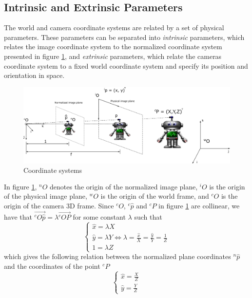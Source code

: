 \subsection{Intrinsic and Extrinsic Parameters}
The world and camera coordinate systems are related by a set of physical parameters. These parameters can be separated into \textit{intrinsic} parameters, which relates the image coordinate system to the normalized coordinate system presented in figure \ref{fig:image_coordinates}, and \textit{extrinsic} parameters, which relate the cameras coordinate system to a fixed world coordinate system and specify its position and orientation in space.
\begin{figure}[H]
    \centering
    \includegraphics[width=\linewidth]{intrinsic.png}
    \caption{Coordinate systems}
    \label{fig:image_coordinates}
\end{figure}
In figure \ref{fig:image_coordinates}, $^nO$ denotes the origin of the normalized image plane, $^iO$ is the origin of the physical image plane, $^wO$ is the origin of the world frame, and $^cO$ is the origin of the camera 3D frame. Since $^cO$, $^c\hat{p}$ and $^cP$ in figure \ref{fig:image_coordinates} are collinear, we have that $\overrightarrow{^cO\hat{p}}=\lambda\overrightarrow{^cOP}$ for some constant $\lambda$ such that
\begin{equation}
\begin{cases}
    \hat{x}=\lambda X \\
    \hat{y}=\lambda Y \Longleftrightarrow \lambda = \frac{\hat{x}}{X}=\frac{\hat{y}}{Y}=\frac{1}{Z}\\
    1 = \lambda Z
\end{cases}
\end{equation}
which gives the following relation between the normalized plane coordinates $^n\hat{p}$ and the coordinates of the point $^cP$
\begin{equation}
\label{eq:perspectiveproj}
    \begin{cases}
    \hat{x}=\frac{X}{Z}\\
    \hat{y}=\frac{Y}{Z}
    \end{cases}
\end{equation}
